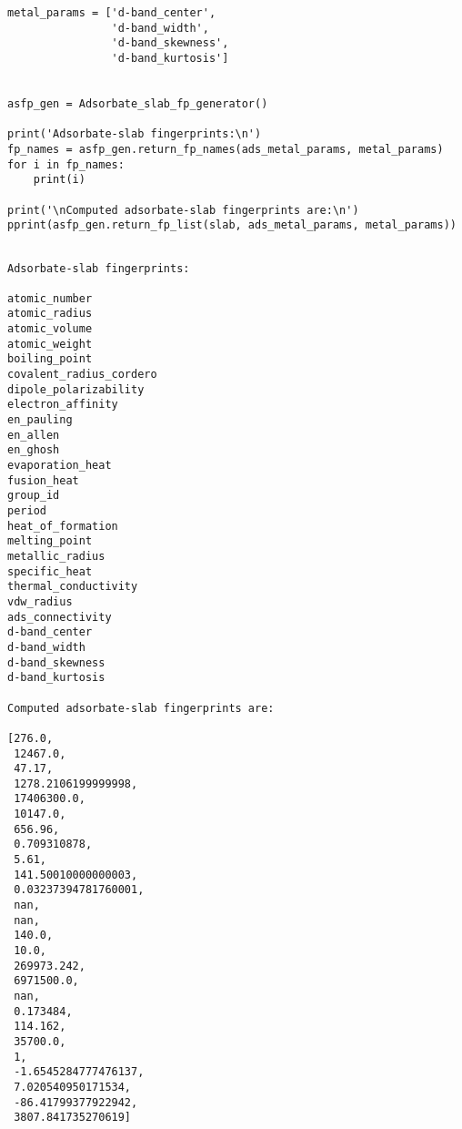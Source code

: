 \documentclass[11pt]{article}
\begin{document}
\begin{verbatim}
metal_params = ['d-band_center',                                            
                'd-band_width',                                             
                'd-band_skewness',                                          
                'd-band_kurtosis']     


asfp_gen = Adsorbate_slab_fp_generator()

print('Adsorbate-slab fingerprints:\n')
fp_names = asfp_gen.return_fp_names(ads_metal_params, metal_params) 
for i in fp_names:
    print(i)

print('\nComputed adsorbate-slab fingerprints are:\n')
pprint(asfp_gen.return_fp_list(slab, ads_metal_params, metal_params))


\end{verbatim}

\begin{verbatim}
Adsorbate-slab fingerprints:

atomic_number
atomic_radius
atomic_volume
atomic_weight
boiling_point
covalent_radius_cordero
dipole_polarizability
electron_affinity
en_pauling
en_allen
en_ghosh
evaporation_heat
fusion_heat
group_id
period
heat_of_formation
melting_point
metallic_radius
specific_heat
thermal_conductivity
vdw_radius
ads_connectivity
d-band_center
d-band_width
d-band_skewness
d-band_kurtosis

Computed adsorbate-slab fingerprints are:

[276.0,
 12467.0,
 47.17,
 1278.2106199999998,
 17406300.0,
 10147.0,
 656.96,
 0.709310878,
 5.61,
 141.50010000000003,
 0.03237394781760001,
 nan,
 nan,
 140.0,
 10.0,
 269973.242,
 6971500.0,
 nan,
 0.173484,
 114.162,
 35700.0,
 1,
 -1.6545284777476137,
 7.020540950171534,
 -86.41799377922942,
 3807.841735270619]
\end{verbatim}
\end{document}

